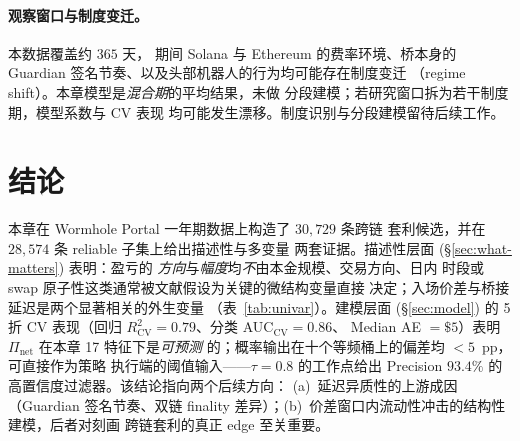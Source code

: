 \documentclass[sigconf,nonacm,10pt]{acmart}
\newcommand{\Pnet}{\Pi_{\text{net}}}
\begin{document}
\paragraph{观察窗口与制度变迁。} 本数据覆盖约 $365$ 天，
期间 Solana 与 Ethereum 的费率环境、桥本身的 Guardian
签名节奏、以及头部机器人的行为均可能存在制度变迁
（regime shift）。本章模型是\emph{混合期}的平均结果，未做
分段建模；若研究窗口拆为若干制度期，模型系数与 CV 表现
均可能发生漂移。制度识别与分段建模留待后续工作。

\section{结论}
\label{sec:conclusion}

本章在 Wormhole Portal 一年期数据上构造了 $30{,}729$ 条跨链
套利候选，并在 $28{,}574$ 条 reliable 子集上给出描述性与多变量
两套证据。描述性层面 (§\ref{sec:what-matters}) 表明：盈亏的
\emph{方向}与\emph{幅度}均\emph{不}由本金规模、交易方向、日内
时段或 swap 原子性这类通常被文献假设为关键的微结构变量直接
决定；入场价差与桥接延迟是两个显著相关的外生变量
（表~\ref{tab:univar}）。建模层面 (§\ref{sec:model}) 的 5 折 CV
表现（回归 $R^2_{\text{CV}}=0.79$、分类 AUC$_{\text{CV}}=0.86$、
Median AE $=\$5$）表明 $\Pnet$ 在本章 17 特征下是\emph{可预测}
的；概率输出在十个等频桶上的偏差均 $<5$~pp，可直接作为策略
执行端的阈值输入——$\tau=0.8$ 的工作点给出 Precision $93.4\%$
的高置信度过滤器。该结论指向两个后续方向：
(a)~延迟异质性的上游成因（Guardian 签名节奏、双链 finality
差异）；(b)~价差窗口内流动性冲击的结构性建模，后者对刻画
跨链套利的真正 edge 至关重要。
\end{document}
